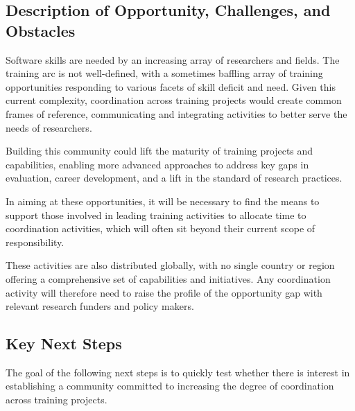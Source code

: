 \subsection{Description of Opportunity, Challenges, and Obstacles}

Software skills are needed by an increasing array of researchers and fields. The
training arc is not well-defined, with a sometimes baffling array of training
opportunities responding to various facets of skill deficit and need. Given this
current complexity, coordination across training projects would create common
frames of reference, communicating and integrating activities to better serve
the needs of researchers.

Building this community could lift the maturity of training projects and
capabilities, enabling more advanced approaches to address key gaps in
evaluation, career development, and a lift in the standard of research
practices.

In aiming at these opportunities, it will be necessary to find the means to
support those involved in leading training activities to allocate time to
coordination activities, which will often sit beyond their current scope of
responsibility.

These activities are also distributed globally, with no single country or region
offering a comprehensive set of capabilities and initiatives. Any coordination
activity will therefore need to raise the profile of the opportunity gap with
relevant research funders and policy makers.

\subsection{Key Next Steps}

The goal of the following next steps is to quickly test whether there is
interest in establishing a community committed to increasing the degree of
coordination across training projects.

